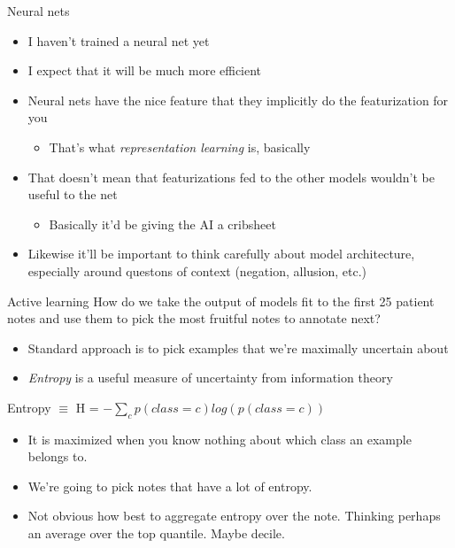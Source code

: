 \documentclass[10pt]{beamer}
\begin{document}
\begin{frame}{Neural nets}
\begin{itemize}
\item I haven't trained a neural net yet
\item I expect that it will be much more efficient
\item Neural nets have the nice feature that they implicitly do the featurization for you
	\begin{itemize}
	\item That's what \textit{representation learning} is, basically
	\end{itemize}
\item That doesn't mean that featurizations fed to the other models wouldn't be useful to the net
	\begin{itemize}
	\item Basically it'd be giving the AI a cribsheet
	\end{itemize}
\item Likewise it'll be important to think carefully about model architecture, especially around questons of context (negation, allusion, etc.)
\end{itemize}
\end{frame}

\begin{frame}{Active learning}
How do we take the output of models fit to the first 25 patient notes and use them to pick the most fruitful notes to annotate next?
\begin{itemize}
\item Standard approach is to pick examples that we're maximally uncertain about
\item \textit{Entropy} is a useful measure of uncertainty from information theory
\end{itemize}
Entropy $\equiv$ H =  $-\displaystyle\sum_{c}p(class = c)log(p(class = c))$
\begin{itemize}
\item It is maximized when you know nothing about which class an example belongs to.
\item We're going to pick notes that have a lot of entropy.
\item Not obvious how best to aggregate entropy over the note.  Thinking perhaps an average over the top quantile.  Maybe decile.
\end{itemize}
\end{frame}
\end{document}
